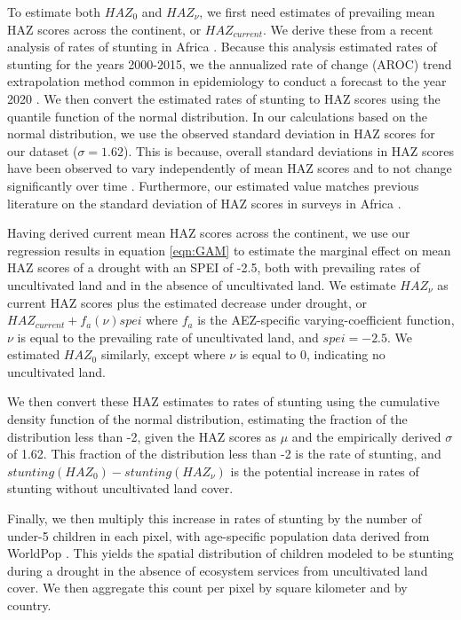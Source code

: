 \documentclass{article}
\begin{document}
To estimate both $HAZ_{0}$ and $HAZ_{\nu}$, we first need estimates of prevailing mean HAZ scores across the continent, or $HAZ_{current}$.  We derive these from a recent analysis of rates of stunting in Africa \cite{Osgood-Zimmerman2018}.  Because this analysis estimated rates of stunting for the years 2000-2015, we the annualized rate of change (AROC) trend extrapolation method common in epidemiology to conduct a forecast to the year 2020 \cite{Fullman2017, Osgood-Zimmerman2018}.  We then convert the estimated rates of stunting to HAZ scores using the quantile function of the normal distribution.  In our calculations based on the normal distribution, we use the observed standard deviation in HAZ scores for our dataset ($\sigma = 1.62$).  This is because, overall standard deviations in HAZ scores have been observed to vary independently of mean HAZ scores and to not change significantly over time \cite{Mei2007}.  Furthermore, our estimated value matches previous literature on the standard deviation of HAZ scores in surveys in Africa \cite{Mei2007}.

Having derived current mean HAZ scores across the continent, we use our regression results in equation \ref{eqn:GAM} to estimate the marginal effect on mean HAZ scores of a drought with an SPEI of -2.5, both with prevailing rates of uncultivated land and in the absence of uncultivated land.  We estimate $HAZ_{\nu}$ as current HAZ scores plus the estimated decrease under drought, or $HAZ_{current} + f_{a}(\nu) spei$ where $f_{a}$ is the AEZ-specific varying-coefficient function, $\nu$ is equal to the prevailing rate of uncultivated land, and $spei = -2.5$.  We estimated $HAZ_{0}$ similarly, except where $\nu$ is equal to 0, indicating no uncultivated land.

We then convert these HAZ estimates to rates of stunting using the cumulative density function of the normal distribution, estimating the fraction of the distribution less than -2, given the HAZ scores as $\mu$ and the empirically derived $\sigma$ of 1.62.  This fraction of the distribution less than -2 is the rate of stunting, and $stunting(HAZ_{0}) - stunting(HAZ_{\nu})$ is the potential increase in rates of stunting without uncultivated land cover.

Finally, we then multiply this increase in rates of stunting by the number of under-5 children in each pixel, with age-specific population data derived from WorldPop \cite{Tatem2017}.  This yields the spatial distribution of children modeled to be stunting during a drought in the absence of ecosystem services from uncultivated land cover.  We then aggregate this count per pixel by square kilometer and by country.
\end{document}
